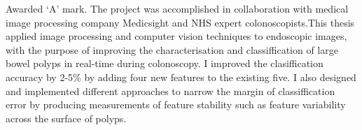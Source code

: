 Awarded `A' mark. The project was accomplished in collaboration with medical image processing company Medicsight and NHS expert colonoscopists.This thesis applied image processing and computer vision techniques to endoscopic images, with the purpose of improving the characterisation and classiffication of large bowel polyps in real-time during colonoscopy.
I improved the clasiffication accuracy by 2-5\% by adding four new features to the existing five.
I also designed and implemented different approaches to narrow the margin of classiffication error by producing measurements of feature stability such as feature variability across the surface of polyps.